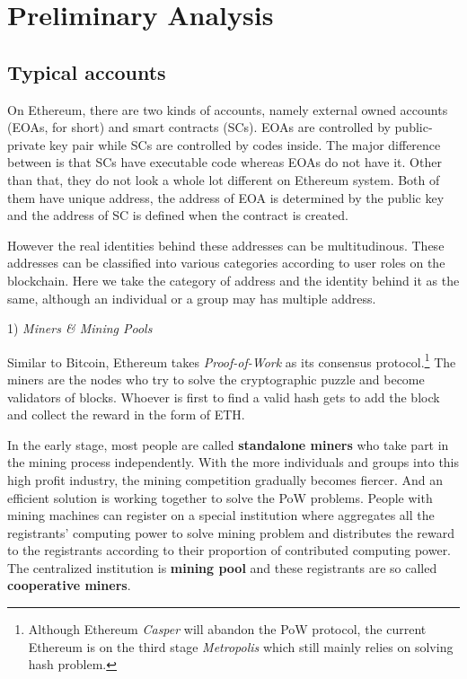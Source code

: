 
\section{Preliminary Analysis}
\subsection{Typical accounts}
On Ethereum, there are two kinds of accounts, namely external owned accounts (EOAs, for short) and smart contracts (SCs). EOAs are controlled by public-private key pair while SCs are controlled by codes inside. The major difference between is that SCs have executable code whereas EOAs do not have it. Other than that, they do not look a whole lot different on Ethereum system. Both of them have unique address, the address of EOA is determined by the public key and the address of SC is defined when the contract is created.  

However the real identities behind these addresses can be multitudinous. These addresses can be classified into various categories according to user roles on the blockchain. Here we take the category of address and the identity behind it as the same, although an individual or a group may has multiple address.

1) \emph{Miners \& Mining Pools}

Similar to Bitcoin, Ethereum takes \emph{Proof-of-Work} as its consensus protocol.\footnote{Although Ethereum \emph{Casper} will abandon the PoW protocol, the current Ethereum is on the third stage \emph{Metropolis} which still mainly relies on solving hash problem.} The miners are the nodes who try to solve the cryptographic puzzle and become validators of blocks. Whoever is first to find a valid hash gets to add the block and collect the reward in the form of ETH.

In the early stage, most people are called \textbf{standalone miners} who take part in the mining process independently. With the more individuals and groups into this high profit industry, the mining competition gradually becomes fiercer. And an efficient solution is working together to solve the PoW problems. People with mining machines can register on a special institution where aggregates all the registrants' computing power to solve mining problem and distributes the reward to the registrants according to their proportion of contributed computing power. The centralized institution is \textbf{mining pool} and these registrants are so called \textbf{cooperative miners}.

